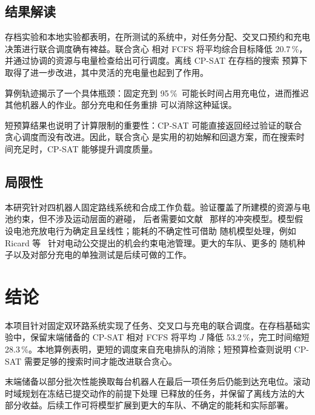 \documentclass[11pt,a4paper,fontset=none]{ctexart}
\newcommand{\pct}{\,\%}
\begin{document}
\subsection{结果解读}

存档实验和本地实验都表明，在所测试的系统中，对任务分配、交叉口预约和充电决策进行联合调度确有裨益。联合贪心
相对 FCFS 将平均综合目标降低 20.7\pct，并通过协调的资源与电量检查给出可行调度。离线 CP-SAT 在存档的搜索
预算下取得了进一步改进，其中灵活的充电量也起到了作用。

算例轨迹揭示了一个具体瓶颈：固定充到 95\pct\ 可能长时间占用充电位，进而推迟其他机器人的作业。部分充电和任务重排
可以消除这种延误。

短预算结果也说明了计算限制的重要性：CP-SAT 可能直接返回经过验证的联合贪心调度而没有改进。因此，联合贪心
是实用的初始解和回退方案，而在搜索时间充足时，CP-SAT 能够提升调度质量。

\subsection{局限性}

本研究针对四机器人固定路线系统和合成工作负载。验证覆盖了所建模的资源与电池约束，但不涉及运动层面的避碰，
后者需要如文献~\cite{li2024conflict} 那样的冲突模型。模型假设电池充放电行为确定且呈线性；能耗的不确定性可借助
随机模型处理，例如 Ricard 等~\cite{ricard2026chance} 针对电动公交提出的机会约束电池管理。更大的车队、更多的
随机种子以及对部分充电的单独测试是后续可做的工作。

\section{结论}
\label{sec:conclusion}

本项目针对固定双环路系统实现了任务、交叉口与充电的联合调度。在存档基础实验中，保留末端储备的 CP-SAT 相对 FCFS
将平均 $J$ 降低 53.2\pct，完工时间缩短 28.3\pct。本地算例表明，更短的调度来自充电排队的消除；短预算检查则说明 CP-SAT 需要足够的搜索时间才能改进联合贪心。

末端储备以部分批次性能换取每台机器人在最后一项任务后仍能到达充电位。滚动时域规划在冻结已提交动作的前提下处理
已释放的任务，并保留了离线方法的大部分收益。后续工作可将模型扩展到更大的车队、不确定的能耗和实际部署。



\appendix
\end{document}
